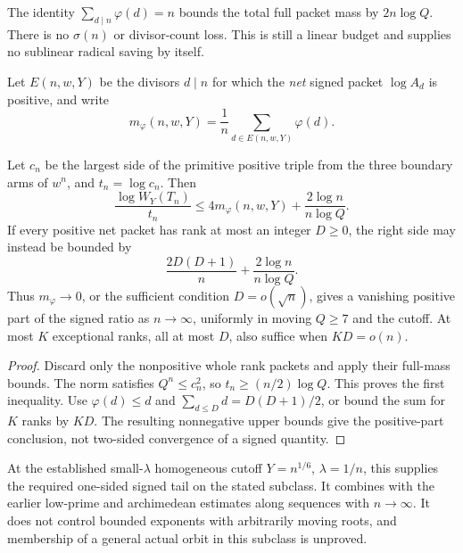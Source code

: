 The identity $\sum_{d\mid n}\varphi(d)=n$ bounds the total full
packet mass by $2n\log Q$. There is no $\sigma(n)$ or divisor-count
loss. This is still a linear budget and supplies no sublinear
radical saving by itself.

Let $E(n,w,Y)$ be the divisors $d\mid n$ for which the \emph{net}
signed packet $\log A_d$ is positive, and write
\[
 m_\varphi(n,w,Y)=\frac1n\sum_{d\in E(n,w,Y)}\varphi(d).
\]
\begin{theorem}\label{cp-sparse}
Let $c_n$ be the largest side of the primitive positive triple from
the three boundary arms of $w^n$, and $t_n=\log c_n$. Then
\[
 \frac{\log W_Y(T_n)}{t_n}
 \le4m_\varphi(n,w,Y)+\frac{2\log n}{n\log Q}.
\]
If every positive net packet has rank at most an integer $D\ge0$, the right side
may instead be bounded by
\[
 \frac{2D(D+1)}n+\frac{2\log n}{n\log Q}.
\]
Thus $m_\varphi\to0$, or the sufficient condition $D=o(\sqrt n)$,
gives a vanishing positive part of the signed ratio as $n\to\infty$,
uniformly in moving $Q\ge7$ and the cutoff. At most $K$ exceptional
ranks, all at most $D$, also suffice when $KD=o(n)$.
\end{theorem}
\begin{proof}
Discard only the nonpositive whole rank packets and apply their
full-mass bounds. The norm satisfies $Q^n\le c_n^2$, so
$t_n\ge(n/2)\log Q$. This proves the first inequality.
Use $\varphi(d)\le d$ and
$\sum_{d\le D}d=D(D+1)/2$, or bound the sum for $K$ ranks by $KD$.
The resulting nonnegative upper bounds give the positive-part
conclusion, not two-sided convergence of a signed quantity.
\end{proof}

At the established small-$\lambda$ homogeneous cutoff
$Y=n^{1/6}$, $\lambda=1/n$, this supplies the required one-sided
signed tail on the stated subclass. It combines with the earlier
low-prime and archimedean estimates along sequences with $n\to\infty$.
It does not control bounded exponents with arbitrarily moving roots,
and membership of a general actual orbit in this subclass is unproved.

